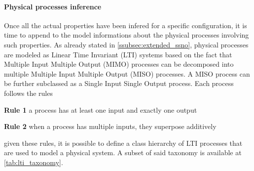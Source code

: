 \paragraph{Physical processes inference}
Once all the actual properties have been infered for a specific configuration, it is time to append to the model informations about the physical processes involving such properties. As already stated in \autoref{ssubsec:extended_ssno}, physical processes are modeled as Linear Time Invariant (LTI) systems based on the fact that Multiple Input Multiple Output (MIMO) processes can be decomposed into multiple Multiple Input Multiple Output (MISO) processes. A MISO process can be further subclassed as a Single Input Single Output process. Each process follows the rules
\begin{description}[noitemsep]
  \item\textbf{Rule 1} a process has at least one input and exactly one output
  \item\textbf{Rule 2} when a process has multiple inputs, they superpose additively
\end{description}
given these rules, it is possible to define a class hierarchy of LTI processes that are used to model a physical system. A subset of said taxonomy is available at \autoref{tab:lti_taxonomy}.
